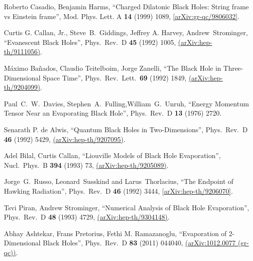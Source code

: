 \documentclass[12pt]{article}
\newcommand{\2}{$^2$}
\newcommand{\3}{$^3$}
\newcommand{\4}{$_4$}
\newcommand{\5}{$_5$}
\begin{document}
\begin{thebibliography}{400}
Roberto Casadio, Benjamin Harms, ``Charged Dilatonic Black Holes: String frame vs Einstein frame'', Mod. Phys. Lett. A \textbf{14} (1999) 1089, \href{http://arxiv.org/abs/gr-qc/9806032}{[arXiv:gr-qc/9806032]}.

Curtis G. Callan, Jr., Steve~B.~Giddings, Jeffrey A. Harvey, Andrew~Strominger,
  ``Evanescent Black Holes'',
  Phys.\ Rev.\ D {\bf 45} (1992) 1005, \href{http://arxiv-web3.library.cornell.edu/abs/hep-th/9111056v1}{
  (arXiv:hep-th/9111056)}.

  M\'aximo Ba\~nados, Claudio Teitelboim, Jorge Zanelli,
  ``The Black Hole in Three-Dimensional Space Time'',
  Phys.\ Rev.\ Lett.\  {\bf 69} (1992) 1849, \href{http://arxiv.org/abs/hep-th/9204099}{
  (arXiv:hep-th/9204099)}.

  Paul~C.~W.~Davies, Stephen~A.~Fulling,William~G.~Unruh,
  ``Energy Momentum Tensor Near an Evaporating Black Hole'',
  Phys.\ Rev.\  D {\bf 13} (1976) 2720.

  Senarath P. de Alwis,
  ``Quantum Black Holes in Two-Dimensions'',
  Phys.\ Rev.\ D {\bf 46} (1992) 5429, \href{http://arxiv.org/abs/hep-th/9207095}{
  (arXiv:hep-th/9207095)}.

  Adel Bilal, Curtis Callan,
  ``Liouville Models of Black Hole Evaporation'', 
  Nucl.\ Phys.\ B {\bf 394} (1993) 73, \href{http://arxiv.org/abs/hep-th/9205089}{
  (arXiv:hep-th/9205089)}.

  Jorge~G.~Russo, Leonard~Susskind and Larus~Thorlacius,
  ``The Endpoint of Hawking Radiation'',
  Phys.\ Rev.\ D {\bf 46} (1992) 3444,
  \href{http://arxiv.org/abs/hep-th/9206070}{[arXiv:hep-th/9206070]}.

  Tsvi Piran, Andrew Strominger,
  ``Numerical Analysis of Black Hole Evaporation'',
  Phys.\ Rev.\ D {\bf 48} (1993) 4729, \href{http://arxiv.org/abs/hep-th/9304148}{
  (arXiv:hep-th/9304148)}.

 Abhay Ashtekar, Frans Pretorius, Fethi M. Ramazanoglu,
  ``Evaporation of 2-Dimensional Black Holes'',
  Phys.\ Rev.\ D {\bf 83} (2011) 044040, \href{http://arxiv.org/abs/1012.0077}{
  (arXiv:1012.0077 (gr-qc))}.


\end{thebibliography}
\end{document}
